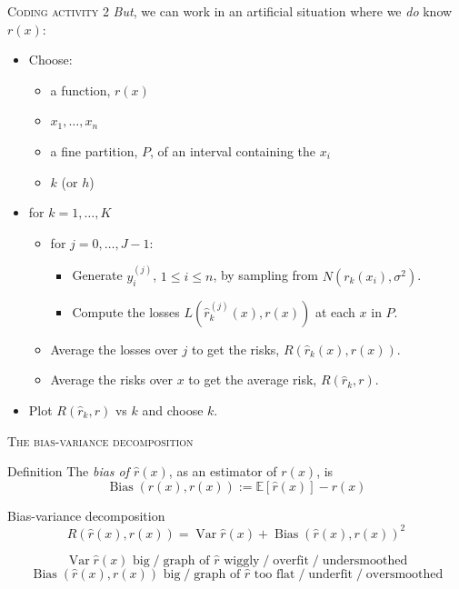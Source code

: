 \documentclass[xcolor={dvipsnames}]{beamer}
\renewcommand{\hat}{\widehat}
\newcommand{\EE}{\mathbb{E}}
\DeclareMathOperator{\Bias}{Bias}
\DeclareMathOperator{\Var}{Var}
\begin{document}
\begin{frame}{\textsc{Coding activity 2}}
    \emph{But}, we can work in an artificial situation where we \emph{do} know $r(x)$:


    \begin{itemize}\setlength{\itemsep}{1ex}
        \item Choose:
        \begin{itemize}
            \item a function, $r(x)$
            \item $x_1,\ldots,x_n$
            \item a fine partition, $P$, of an interval containing the $x_i$
            \item $k$ (or $h$)
        \end{itemize}
            \item for $k=1,\ldots,K$
        \begin{itemize}
        \item for $j=0,\ldots,J-1$:
        \begin{itemize}
            \item Generate $y_i^{(j)}$, $1\leq i\leq n$, by sampling from $N(r_k(x_i), \sigma^2)$.
            \item Compute the losses $L(\hat r^{(j)}_k(x), r(x))$ at each $x$ in $P$.
        \end{itemize}
    \item Average the losses over $j$ to get the risks, $R(\hat r_k(x), r(x))$.
    \item Average the risks over $x$ to get the average risk, $R(\hat r_k, r)$.
    \end{itemize}
    \item Plot $R(\hat r_k, r)$ vs $k$ and choose $k$.
\end{itemize}
\end{frame}

\begin{frame}{\textsc{The bias-variance decomposition}}

    \begin{block}{Definition}
        The \emph{bias of $\hat r(x)$}, as an estimator of $r(x)$, is
        \[
            \Bias(\hat r(x), r(x)) := \EE[\hat r(x)] - r(x)
        \]
    \end{block}

    \begin{block}{Bias-variance decomposition}
        \[
            R(\hat r(x), r(x)) = \Var \hat r(x) + \Bias(\hat r(x), r(x))^2
        \]
    \end{block}

    \[
        \text{$\Var \hat r(x)$ big} \;/\; \text{graph of $\hat r$ wiggly} \;/\; \text{overfit}
        \;/\; \text{undersmoothed}
    \]
    \[
        \text{$\Bias(\hat r(x), r(x))$ big} \;/\; \text{graph of $\hat r$ too flat} \;/\; \text{underfit}
        \;/\; \text{oversmoothed}
    \]
\end{frame}
\end{document}
